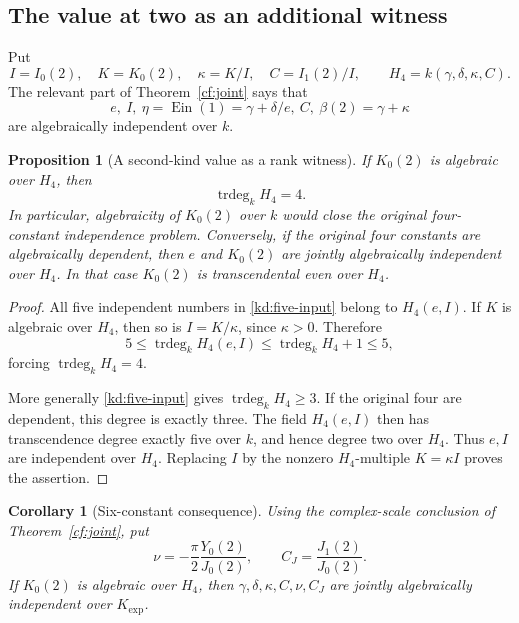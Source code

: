 \documentclass[11pt]{article}
\newtheorem{proposition}[theorem]{Proposition}
\newtheorem{corollary}[theorem]{Corollary}
\theoremstyle{definition}
\theoremstyle{remark}
\newcommand{\Ein}{\operatorname{Ein}}
\begin{document}
\subsection{The value at two as an additional witness}

Put
\[
 I=I_0(2),\quad K=K_0(2),\quad
 \kappa=K/I,\quad C=I_1(2)/I,
 \qquad H_4=k(\gamma,\delta,\kappa,C).
\]
The relevant part of Theorem~\ref{cf:joint} says that
\begin{equation}\label{kd:five-input}
 e,\ I,\ \eta=\Ein(1)=\gamma+\delta/e,
 \ C,\ \beta(2)=\gamma+\kappa
\end{equation}
are algebraically independent over $k$.

\begin{proposition}[A second-kind value as a rank witness]
\label{kd:K-witness}
If $K_0(2)$ is algebraic over $H_4$, then
\[
                  \operatorname{trdeg}_k H_4=4.
\]
In particular, algebraicity of $K_0(2)$ over $k$ would close the original
four-constant independence problem.  Conversely, if the original four
constants are algebraically dependent, then $e$ and $K_0(2)$ are jointly
algebraically independent over $H_4$.  In that case $K_0(2)$ is
transcendental even over $H_4$.
\end{proposition}

\begin{proof}
All five independent numbers in \eqref{kd:five-input} belong to
$H_4(e,I)$.  If $K$ is algebraic over $H_4$, then so is $I=K/\kappa$,
since $\kappa>0$.  Therefore
\[
 5\leq\operatorname{trdeg}_k H_4(e,I)
   \leq\operatorname{trdeg}_k H_4+1\leq5,
\]
forcing $\operatorname{trdeg}_k H_4=4$.

More generally \eqref{kd:five-input} gives
$\operatorname{trdeg}_k H_4\geq3$.  If the original four are dependent,
this degree is exactly three.  The field $H_4(e,I)$ then has
transcendence degree exactly five over $k$, and hence degree two over
$H_4$.  Thus $e,I$ are independent over $H_4$.  Replacing $I$ by the
nonzero $H_4$-multiple $K=\kappa I$ proves the assertion.
\end{proof}

\begin{corollary}[Six-constant consequence]\label{kd:six-witness}
Using the complex-scale conclusion of Theorem~\ref{cf:joint}, put
\[
 \nu=-\frac{\pi}{2}\frac{Y_0(2)}{J_0(2)},\qquad
 C_J=\frac{J_1(2)}{J_0(2)}.
\]
If $K_0(2)$ is algebraic over $H_4$, then
$\gamma,\delta,\kappa,C,\nu,C_J$ are jointly algebraically independent
over $K_{\exp}$.
\end{corollary}
\end{document}
